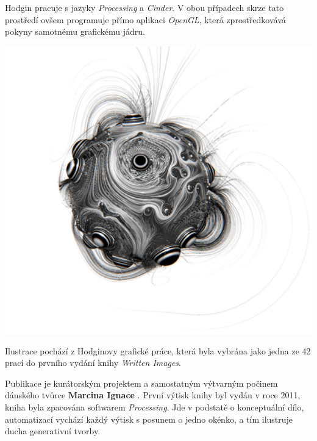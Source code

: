 \documentclass[10pt,twoside=true,open=right,cleardoublepage=empty,chapterprefix=true]{scrbook}
\begin{document}
Hodgin pracuje s jazyky {\em Processing} a {\em Cinder}. V obou případech skrze tato prostředí ovšem programuje přímo aplikaci {\em OpenGL}, která zprostředkovává pokyny samotnému grafickému jádru.

\vfill
\begin{centering}
\includegraphics[width = 1\textwidth]{imgs/hogin.png}
\end{centering}

Ilustrace pochází z Hodginovy   grafické práce, která byla vybrána jako jedna ze 42 prací do prvního vydání knihy {\em Written Images}.

Publikace je kurátorským projektem a samostatným výtvarným počinem dánského tvůrce \textbf{Marcina Ignace} . První výtisk knihy byl vydán v roce 2011, kniha byla zpacována softwarem {\em Processing}. Jde v podstatě o konceptuální dílo, automatizací vychází každý výtisk s posunem o jedno okénko, a tím ilustruje ducha generativní tvorby. \vfill
\end{document}
